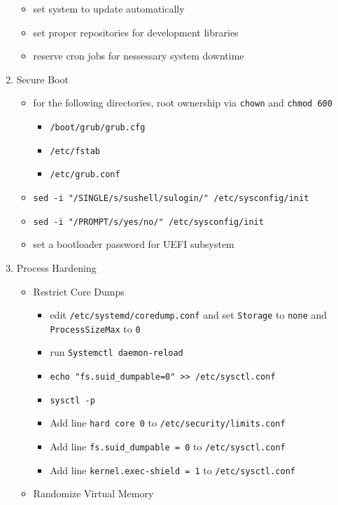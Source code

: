 \documentclass[12pt, letterpaper,oneocolumn]{article}
\begin{document}
\begin{appendices}
\begin{enumerate}
  \begin{itemize}
  \item
    set system to update automatically
  \item
    set proper repositories for development libraries
  \item
    reserve cron jobs for nessessary system downtime
  \end{itemize}
\item
  Secure Boot

  \begin{itemize}
  \item
    for the following directories, root ownership via \texttt{chown} and
    \texttt{chmod\ 600}

    \begin{itemize}
    \item
      \texttt{/boot/grub/grub.cfg}
    \item
      \texttt{/etc/fstab}
    \item
      \texttt{/etc/grub.conf}
    \end{itemize}
  \item
    \texttt{sed\ -i\ "/SINGLE/s/sushell/sulogin/"\ /etc/sysconfig/init}
  \item
    \texttt{sed\ -i\ "/PROMPT/s/yes/no/"\ /etc/sysconfig/init}
  \item
    set a bootloader password for UEFI subsystem
  \end{itemize}
\item
  Process Hardening

  \begin{itemize}
  \item
    Restrict Core Dumps

    \begin{itemize}
    \item
      edit \texttt{/etc/systemd/coredump.conf} and set \texttt{Storage}
      to \texttt{none} and \texttt{ProcessSizeMax} to \texttt{0}
    \item
      run \texttt{Systemctl\ daemon-reload}
    \item
      \texttt{echo\ "fs.suid\_dumpable=0"\ \textgreater{}\textgreater{}\ /etc/sysctl.conf}
    \item
      \texttt{sysctl\ -p}
    \item
      Add line \texttt{hard\ core\ 0} to
      \texttt{/etc/security/limits.conf}
    \item
      Add line \texttt{fs.suid\_dumpable\ =\ 0} to
      \texttt{/etc/sysctl.conf}
    \item
      Add line \texttt{kernel.exec-shield\ =\ 1} to
      \texttt{/etc/sysctl.conf}
    \end{itemize}
  \item
    Randomize Virtual Memory


\end{itemize}
\end{enumerate}
\end{appendices}
\end{document}
